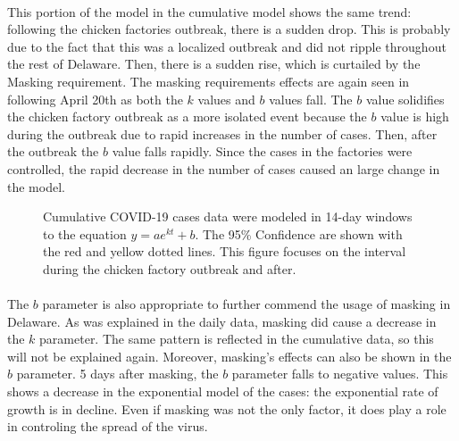 \documentclass[12pt]{article}
\begin{document}
\paragraph{} This portion of the model in the cumulative model shows the same trend: following the chicken factories outbreak, there is a sudden drop. This is probably due to the fact that this was a localized outbreak and did not ripple throughout the rest of Delaware. Then, there is a sudden rise, which is curtailed by the Masking requirement. The masking requirements effects are again seen in following April 20th as both the $k$ values and $b$ values fall. The $b$ value solidifies the chicken factory outbreak as a more isolated event because the $b$ value is high during the outbreak due to rapid increases in the number of cases. Then, after the outbreak the $b$ value falls rapidly. Since the cases in the factories were controlled, the rapid decrease in the number of cases caused an large change in the model.

\begin{figure}[h]
  \centering
  \hfill
  \caption{Cumulative COVID-19 cases data were modeled in 14-day windows to the equation $y=ae^{kt}+b$. The 95\% Confidence are shown with the red and yellow dotted lines. This figure focuses on the interval during the chicken factory outbreak and after.}
  \label{fig:13}
\end{figure}

\paragraph{} The $b$ parameter is also appropriate to further commend the usage of masking in Delaware. As was explained in the daily data, masking did cause a decrease in the $k$ parameter. The same pattern is reflected in the cumulative data, so this will not be explained again. Moreover, masking's effects can also be shown in the $b$ parameter. 5 days after masking, the $b$ parameter falls to negative values. This shows a decrease in the exponential model of the cases: the exponential rate of growth is in decline. Even if masking was not the only factor, it does play a role in controling the spread of the virus.
\end{document}
